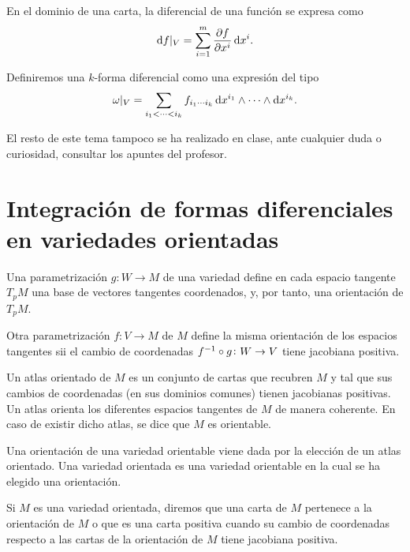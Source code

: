 \begin{prop}
    En el dominio de una carta, la diferencial de una función se expresa como
    \[
        \dif f \vert_V = \sum^m_{i= 1} \frac{\partial f}{\partial x^i} \dif x^i.
    \]
\end{prop}

\begin{defi}
    Definiremos una $k$-forma diferencial como una expresión del tipo
    \[
        \omega\vert_V = \sum_{i_1 < \cdots < i_k} f_{i_1 \cdots i_k} \dif x^{i_1} \wedge \cdots \wedge \dif x^{i_k}.
    \]
\end{defi}

El resto de este tema tampoco se ha realizado en clase, ante cualquier duda o curiosidad, consultar los apuntes del profesor.

\section{Integración de formas diferenciales en variedades orientadas}

\begin{defi}
    Una parametrización $g \colon W \to M$ de una variedad define en cada espacio tangente $T_pM$ una base de vectores tangentes
    coordenados, y, por tanto, una orientación de $T_pM$.

    Otra parametrización $f \colon V \to M$ de $M$ define la misma orientación de los espacios tangentes sii el cambio de coordenadas
    $f^{-1} \circ g \colon W \to V$ tiene jacobiana positiva.
\end{defi}

\begin{defi}
    Un atlas orientado de $M$ es un conjunto de cartas que recubren $M$ y tal que sus cambios de coordenadas (en sus dominios comunes)
    tienen jacobianas positivas. Un atlas orienta los diferentes espacios tangentes de $M$ de manera coherente. En caso de existir dicho atlas,
    se dice que $M$ es orientable.
\end{defi}

\begin{defi}
    Una orientación de una variedad orientable viene dada por la elección de un atlas orientado. Una variedad orientada es una variedad
    orientable en la cual se ha elegido una orientación.
\end{defi}

\begin{defi}
    Si $M$ es una variedad orientada, diremos que una carta de $M$ pertenece a la orientación de $M$ o que es una carta positiva cuando su
    cambio de coordenadas respecto a las cartas de la orientación de $M$ tiene jacobiana positiva.
\end{defi}

